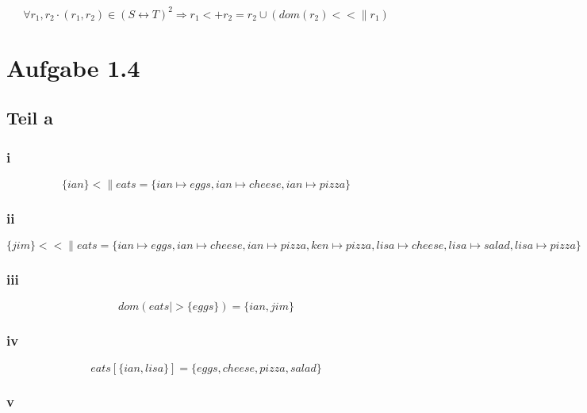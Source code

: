 \documentclass[10pt,a4paper]{article}
\begin{document}
\begin{equation}
  \forall r_{1}, r_{2} \cdot (r_{1}, r_{2}) \in (S \leftrightarrow T)^{2} \Rightarrow r_{1} <+ r_{2} = r_{2} \cup (dom(r_{2}) <<\| r_{1})
\end{equation}

\section{Aufgabe 1.4}

\subsection{Teil a}

\subsubsection{i}

\begin{equation}
  \{ ian \} <\| eats = \{ ian \mapsto eggs, ian \mapsto cheese, ian \mapsto pizza \}
\end{equation}

\subsubsection{ii}

\begin{equation}
  \{ jim \} <<\| eats = \{ ian \mapsto eggs, ian \mapsto cheese, ian \mapsto pizza, ken \mapsto pizza, lisa \mapsto cheese, lisa \mapsto salad, lisa \mapsto pizza \}
\end{equation}

\subsubsection{iii}

\begin{equation}
  dom(eats |> \{ eggs \}) = \{ ian, jim \}
\end{equation}

\subsubsection{iv}

\begin{equation}
  eats[\{ ian, lisa \}] = \{ eggs, cheese, pizza, salad \}
\end{equation}

\subsubsection{v}
\end{document}
